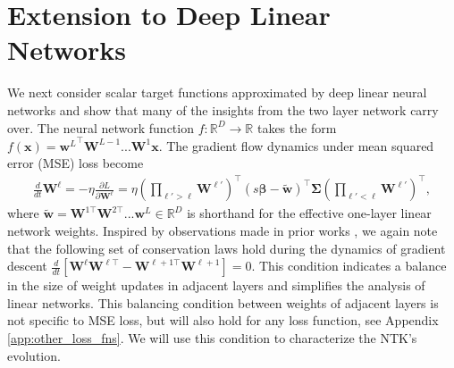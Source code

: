 \documentclass{article} %
\def\x{\bm x}
\begin{document}
\section{Extension to Deep Linear Networks}\label{sec:deep_linear}
We next consider scalar target functions approximated by deep linear neural networks and show that many of the insights from the two layer network carry over. The neural network function $f : \mathbb{R}^{D} \to \mathbb{R}$ takes the form $f(\x) = {\bm w^{L}}^\top \bm W^{L-1} ... \bm W^{1} \x$. The gradient flow dynamics under mean squared error (MSE) loss become
\begin{align}
    \frac{d}{dt} \bm W^{\ell} = - \eta \frac{\partial L}{\partial \bm W^{\ell}} = \eta \left( \prod_{\ell' > \ell} \bm W^{\ell'} \right)^{\top} \left( s \bm \beta - \bm{\tilde{w}} \right)^\top \bm \Sigma \left( \prod_{\ell' < \ell} \bm W^{\ell' } \right)^\top,
\end{align}
where $\bm{\tilde{w}} = \bm W^{1 \top} \bm W^{2 \top} ... \bm w^{L } \in \mathbb{R}^{D}$ is shorthand for the effective one-layer linear network weights. %
Inspired by observations made in prior works \citep{fukumizu1998effect,arora_cohen_linear_acc, Du2018AlgorithmicRI}, we again note that the following set of conservation laws hold during the dynamics of gradient descent $\frac{d}{dt} \left[  \bm W^{\ell} \bm W^{\ell \top} -  \bm W^{\ell+1 \top} \bm W^{\ell + 1} \right] = 0$. This condition indicates a balance in the size of weight updates in adjacent layers and simplifies the analysis of linear networks. This balancing condition between weights of adjacent layers is not specific to MSE loss, but will also hold for any loss function, see Appendix \ref{app:other_loss_fns}. We will use this condition to characterize the NTK's evolution.
\end{document}
